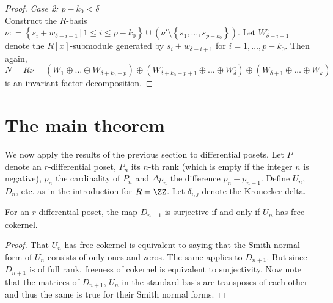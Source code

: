 \begin{proof}
\textit{Case 2: $p-k_{0} < \delta $}\\

Construct the $ R$-basis $ \nu : =  \left \{  s_{i} + w_{\delta - i + 1   }  \, | \, 1 \leq i \leq   p - k_{0}    \right \}     \cup ( \nu' \setminus \left \{  s_{1}, \ldots, s_{ p - k_{0}}   \right \}   )   $.  Let $ W_{\delta - i  + 1 }^{\circ} $ denote the $ R[x]$-submodule generated by $ s_{i} + w_{\delta - i + 1 }  $ for $ i = 1, \ldots, p -  k_{0} $. Then again, 
$$ N = R \nu = \left (  W_{1} \oplus \ldots \oplus W_{ \delta  + k _{0 } - p } \right )  \oplus  \left (  W_{ \delta  + k_{0}  - p %
   + 1 }^{\circ}   \oplus \ldots \oplus  W_{\delta } ^\circ \right )    \oplus \left (   W_{\delta+1} \oplus  \ldots \oplus  W_{k}  \right )    $$  
is an invariant factor decomposition.    
 \end{proof} 





\section{The main theorem}    
We now apply the results of the previous section to differential posets. Let $  P $ denote an $ r $-differential poset, $ P_{n} $ its $ n $-th rank (which is empty if the integer  $ n $ is negative),  $ p_{n} $ the cardinality of $ P_{n} $ and $ \Delta p_{n} $ the difference  $  p_{n} - p_{n-1} $. Define $U_{n}$, $D_{n}$, etc. as in the  introduction  for  $ R = \ZZ $. Let $ \delta_{i,j} $ denote the Kronecker delta.     

\begin{lemma}       \label{freecokernel}                For  an  $ r $-differential poset, the map $ D_{n+1} $ is surjective    if and only if $ U_{n}   $ has free cokernel.                          
\end{lemma}      


\begin{proof} That $ U_{n} $ has free cokernel is equivalent to saying that the Smith normal form of $ U_{n} $ consists of only ones and  zeros.  The same applies to $ D_{n+1} $. But since $ D_{n+1} $ is of full rank, freeness of cokernel is equivalent to  surjectivity. Now note that the matrices of  $ D_{n+1} $, $ U_{n} $ in the standard basis are transposes  of each other and thus the same is true for their Smith normal forms. 
\end{proof}          



